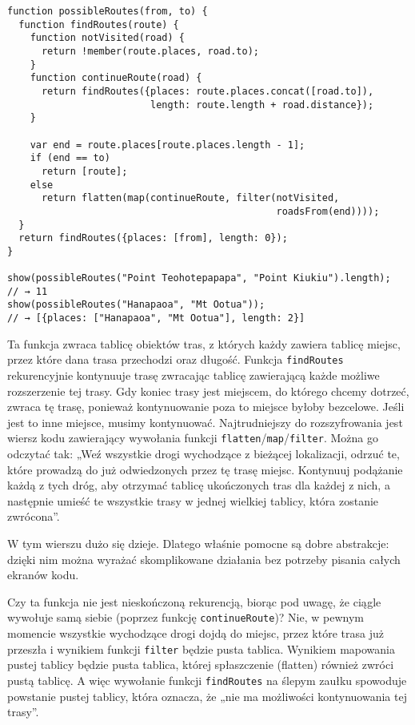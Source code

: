   
\begin{verbatim} 
function possibleRoutes(from, to) {
  function findRoutes(route) {
    function notVisited(road) {
      return !member(route.places, road.to);
    }
    function continueRoute(road) {
      return findRoutes({places: route.places.concat([road.to]),
                         length: route.length + road.distance});
    }

    var end = route.places[route.places.length - 1];
    if (end == to)
      return [route];
    else
      return flatten(map(continueRoute, filter(notVisited,
                                               roadsFrom(end))));
  }
  return findRoutes({places: [from], length: 0});
}

show(possibleRoutes("Point Teohotepapapa", "Point Kiukiu").length);
// → 11
show(possibleRoutes("Hanapaoa", "Mt Ootua"));
// → [{places: ["Hanapaoa", "Mt Ootua"], length: 2}]
\end{verbatim}
  
Ta funkcja zwraca tablicę obiektów tras, z których każdy zawiera tablicę miejsc, przez które dana trasa przechodzi oraz długość. Funkcja \texttt{findRoutes} rekurencyjnie kontynuuje trasę zwracając tablicę zawierającą każde możliwe rozszerzenie tej trasy. Gdy koniec trasy jest miejscem, do którego chcemy dotrzeć, zwraca tę trasę, ponieważ kontynuowanie poza to miejsce byłoby bezcelowe. Jeśli jest to inne miejsce, musimy kontynuować. Najtrudniejszy do rozszyfrowania jest wiersz kodu zawierający wywołania funkcji \texttt{flatten}/\texttt{map}/\texttt{filter}. Można go odczytać tak: „Weź wszystkie drogi wychodzące z bieżącej lokalizacji, odrzuć te, które prowadzą do już odwiedzonych przez tę trasę miejsc. Kontynuuj podążanie każdą z tych dróg, aby otrzymać tablicę ukończonych tras dla każdej z nich, a następnie umieść te wszystkie trasy w jednej wielkiej tablicy, która zostanie zwrócona”.

  
W tym wierszu dużo się dzieje. Dlatego właśnie pomocne są dobre abstrakcje: dzięki nim można wyrażać skomplikowane działania bez potrzeby pisania całych ekranów kodu.

  
Czy ta funkcja nie jest nieskończoną rekurencją, biorąc pod uwagę, że ciągle wywołuje samą siebie (poprzez funkcję \texttt{continueRoute})? Nie, w pewnym momencie wszystkie wychodzące drogi dojdą do miejsc, przez które trasa już przeszła i wynikiem funkcji \texttt{filter} będzie pusta tablica. Wynikiem mapowania pustej tablicy będzie pusta tablica, której spłaszczenie (flatten) również zwróci pustą tablicę. A więc wywołanie funkcji \texttt{findRoutes} na ślepym zaułku spowoduje powstanie pustej tablicy, która oznacza, że „nie ma możliwości kontynuowania tej trasy”.

